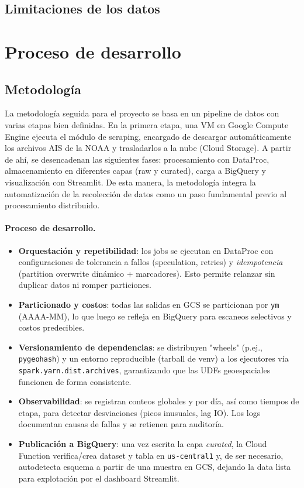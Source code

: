 \documentclass[10pt]{article}
\begin{document}
\subsection{Limitaciones de los datos} %
\section{Proceso de desarrollo}
\subsection{Metodología} %

La metodología seguida para el proyecto se basa en un pipeline de datos con varias etapas bien definidas. En la primera etapa, una VM en Google Compute Engine ejecuta el módulo de scraping, encargado de descargar automáticamente los archivos AIS de la NOAA y trasladarlos a la nube (Cloud Storage). 
A partir de ahí, se desencadenan las siguientes fases: procesamiento con DataProc, almacenamiento en diferentes capas (raw y curated), carga a BigQuery y visualización con Streamlit. 
De esta manera, la metodología integra la automatización de la recolección de datos como un paso fundamental previo al procesamiento distribuido.

\paragraph{Proceso de desarrollo.}
\begin{itemize}
  \item \textbf{Orquestación y repetibilidad}: los jobs se ejecutan en DataProc con configuraciones de tolerancia a fallos (speculation, retries) y \emph{idempotencia} (partition overwrite dinámico + marcadores). Esto permite relanzar sin duplicar datos ni romper particiones.
  \item \textbf{Particionado y costos}: todas las salidas en GCS se particionan por \texttt{ym} (AAAA-MM), lo que luego se refleja en BigQuery para escaneos selectivos y costos predecibles.
  \item \textbf{Versionamiento de dependencias}: se distribuyen "wheels" (p.ej., \texttt{pygeohash}) y un entorno reproducible (tarball de venv) a los ejecutores vía \texttt{spark.yarn.dist.archives}, garantizando que las UDFs geoespaciales funcionen de forma consistente.
  \item \textbf{Observabilidad}: se registran conteos globales y por día, así como tiempos de etapa, para detectar desviaciones (picos inusuales, lag IO). Los logs documentan causas de fallas y se retienen para auditoría.
  \item \textbf{Publicación a BigQuery}: una vez escrita la capa \textit{curated}, la Cloud Function verifica/crea dataset y tabla en \texttt{us-central1} y, de ser necesario, autodetecta esquema a partir de una muestra en GCS, dejando la data lista para explotación por el dashboard Streamlit.
\end{itemize}
\end{document}
